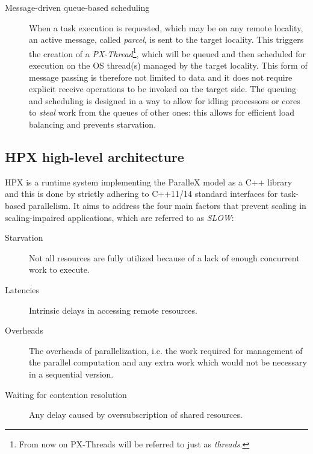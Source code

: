 \begin{description}
	\item [Message-driven queue-based scheduling] When a task execution is requested, which may be on any remote locality, an active message, called \emph{parcel}, is sent to the target locality. This triggers the creation of a \emph{PX-Thread}\footnote{From now on PX-Threads will be referred to just as \emph{threads}.}, which will be queued and then scheduled for execution on the OS thread(s) managed by the target locality. This form of message passing is therefore not limited to data and it does not require explicit receive operations to be invoked on the target side. The queuing and scheduling is designed in a way to allow for idling processors or cores to \emph{steal} work from the queues of other ones: this allows for efficient load balancing and prevents starvation.
\end{description}


\subsection{HPX high-level architecture}
HPX is a runtime system implementing the ParalleX model as a C++ library and this is done by strictly adhering to C++11/14 standard interfaces for task-based parallelism.
It aims to address the four main factors that prevent scaling in scaling-impaired applications, which are referred to as \emph{SLOW}\cite{kaiser2014hpx}:
\begin{description}
	\item [Starvation] Not all resources are fully utilized because of a lack of enough concurrent work to execute.
	\item [Latencies] Intrinsic delays in accessing remote resources.
	\item [Overheads] The overheads of parallelization, i.e. the work required for management of the parallel computation and any extra work which would not be necessary in a sequential version.
	\item [Waiting for contention resolution] Any delay caused by oversubscription of shared resources.
\end{description}

